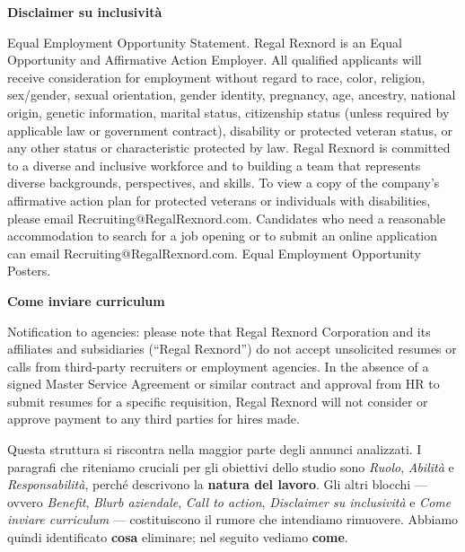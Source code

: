 \noindent\textbf{\textcolor{inclusivityColor}{Disclaimer su inclusività}}\par
\noindent Equal Employment Opportunity Statement. Regal Rexnord is an Equal Opportunity and Affirmative Action Employer. All qualified applicants will receive consideration for employment without regard to race, color, religion, sex/gender, sexual orientation, gender identity, pregnancy, age, ancestry, national origin, genetic information, marital status, citizenship status (unless required by applicable law or government contract), disability or protected veteran status, or any other status or characteristic protected by law. Regal Rexnord is committed to a diverse and inclusive workforce and to building a team that represents diverse backgrounds, perspectives, and skills. To view a copy of the company's affirmative action plan for protected veterans or individuals with disabilities, please email Recruiting@RegalRexnord.com. Candidates who need a reasonable accommodation to search for a job opening or to submit an online application can email Recruiting@RegalRexnord.com. Equal Employment Opportunity Posters.\par
\noindent{\color{inclusivityColor}\rule{\textwidth}{0.6pt}}\par\medskip

\noindent\textbf{\textcolor{applicationColor}{Come inviare curriculum}}\par
\noindent Notification to agencies: please note that Regal Rexnord Corporation and its affiliates and subsidiaries (``Regal Rexnord'') do not accept unsolicited resumes or calls from third-party recruiters or employment agencies. In the absence of a signed Master Service Agreement or similar contract and approval from HR to submit resumes for a specific requisition, Regal Rexnord will not consider or approve payment to any third parties for hires made.\par
\noindent{\color{applicationColor}\rule{\textwidth}{0.6pt}}\par\medskip

Questa struttura si riscontra nella maggior parte degli annunci analizzati. I paragrafi che riteniamo cruciali per gli obiettivi dello studio sono \textit{Ruolo}, \textit{Abilità} e \textit{Responsabilità}, perché descrivono la \textbf{natura del lavoro}. Gli altri blocchi — ovvero \textit{Benefit}, \textit{Blurb aziendale}, \textit{Call to action}, \textit{Disclaimer su inclusività} e \textit{Come inviare curriculum} — costituiscono il rumore che intendiamo rimuovere. Abbiamo quindi identificato \textbf{cosa} eliminare; nel seguito vediamo \textbf{come}.

